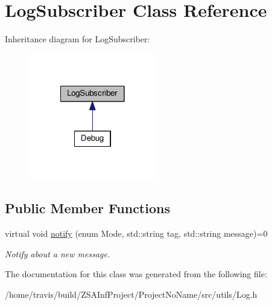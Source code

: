 \hypertarget{classLogSubscriber}{\section{Log\-Subscriber Class Reference}
\label{classLogSubscriber}
}


Inheritance diagram for Log\-Subscriber\-:
\nopagebreak
\begin{figure}[H]
\begin{center}
\leavevmode
\includegraphics[width=158pt]{classLogSubscriber__inherit__graph}
\end{center}
\end{figure}
\subsection*{Public Member Functions}
\begin{DoxyCompactItemize}
\item 
\hypertarget{classLogSubscriber_a4ae9dd8b523ff8e8b5ee2d2380b78158}{virtual void \hyperlink{classLogSubscriber_a4ae9dd8b523ff8e8b5ee2d2380b78158}{notify} (enum Mode, std\-::string tag, std\-::string message)=0}\label{classLogSubscriber_a4ae9dd8b523ff8e8b5ee2d2380b78158}

\begin{DoxyCompactList}\small\item\em Notify about a new message. \end{DoxyCompactList}\end{DoxyCompactItemize}


The documentation for this class was generated from the following file\-:\begin{DoxyCompactItemize}
\item 
/home/travis/build/\-Z\-S\-A\-Inf\-Project/\-Project\-No\-Name/src/utils/Log.\-h\end{DoxyCompactItemize}
